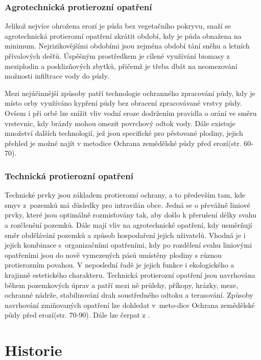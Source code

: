\subsubsection{Agrotechnická protierozní opatření}
Jelikož nejvíce ohrožena erozí je půda bez vegetačního pokryvu, snaží
se agrotechnická protierozní opatření zkrátit období, kdy je půda
obnažena na minimum. Nej\-rizikovějšími obdobími jsou zejména období
tání sněhu a letních přívalových dešťů. Úspěšným prostředkem je cílené
využívání biomasy z meziplodin a posklizňových zbytků, přičemž je
třeba dbát na neomezování možnosti infiltrace vody do půdy.

Mezi nejúčinnější způsoby patří technologie ochranného zpracování
půdy, kdy je místo orby využíváno kypření půdy bez obracení
zpracovávané vrstvy půdy. Ovšem i při orbě lze snížit vliv vodní eroze
dodržením pravidla o orání ve směru vrstevnic, kdy brázdy mohou omezit
povrchový odtok vody. Dále existuje množství dalších technologií, jež
jsou specifické pro pěstované plodiny, jejich přehled je možné najít v
metodice Ochrana zemědělské půdy před
erozí\cite{janecek2012}(str. 60-70).\cite{Holy1994}

\subsubsection{Technická protierozní opatření}
Technické prvky jsou základem protierozní ochrany, a to především tam,
kde smyv z~pozemků má důsledky pro intravilán obce. Jedná se o
převážně liniové prvky, které jsou optimálně rozmisťovány tak, aby
došlo k přerušení délky svahu a rozčlenění pozemků. Dále mají vliv na
agrotechnické opatření, kdy usměrňují směr obdělávání pozemků a způsob
hospodaření jejich uživatelů. Vhodná je i jejich kombinace s~organizačními opatřeními, kdy po rozdělení svahu liniovými opatřeními
jsou do nově vymezených pásů umístěny plodiny s různou protierozním
povahou. V neposlední řadě je jejich funkce i ekologického a krajinně
estetického charakteru. Technická protierozní opatření jsou navrhována
během pozemkových úprav a patří mezi ně průlehy, příkopy, hrázky,
meze, ochranné nádrže, stabilizování drah soustředného odtoku a
terasování. Způsoby navrhování zmiňovaných opatření lze dohledat
v~meto-dice Ochrana zemědělské půdy před
erozí\cite{janecek2012}(str. 70-90). Dále lze čerpat z
\cite{Kadlec2014}\cite{Novotny2014}.
\newpage
\section{Historie}
